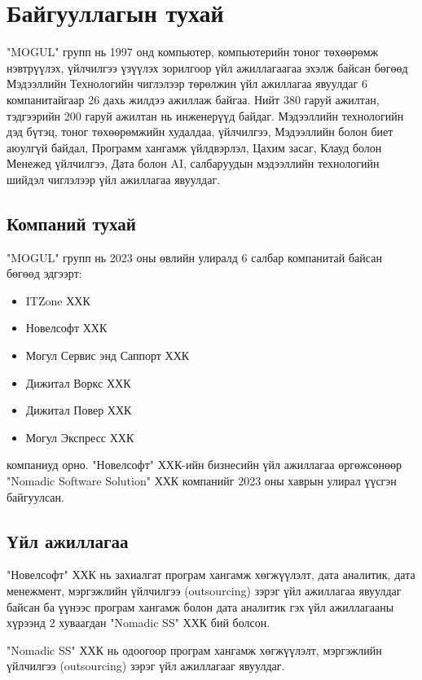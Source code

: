 \chapter{Байгууллагын тухай}

\hspace{0.5cm}
"MOGUL" групп нь 1997 онд компьютер, компьютерийн тоног төхөөрөмж нэвтрүүлэх, үйлчилгээ үзүүлэх зорилгоор үйл ажиллагаагаа эхэлж байсан бөгөөд Мэдээллийн Технологийн чиглэлээр төрөлжин үйл ажиллагаа явуулдаг 6 компанитайгаар 26 дахь жилдээ ажиллаж байгаа. Нийт 380 гаруй ажилтан, тэдгээрийн 200 гаруй ажилтан нь инженерүүд байдаг. Мэдээллийн технологийн дэд бүтэц, тоног төхөөрөмжийн худалдаа, үйлчилгээ, Мэдээллийн болон биет аюулгүй байдал, Программ хангамж үйлдвэрлэл, Цахим засаг, Клауд болон Менежед үйлчилгээ, Дата болон AI, салбаруудын мэдээллийн технологийн шийдэл чиглэлээр үйл ажиллагаа явуулдаг.

\section{Компаний тухай}
"MOGUL" групп нь 2023 оны өвлийн улиралд 6 салбар компанитай байсан бөгөөд эдгээрт: 
\begin{itemize}
	\item ITZone ХХК
	\item Новелсофт ХХК
	\item Могул Сервис энд Саппорт ХХК
	\item Дижитал Воркс ХХК
	\item Дижитал Повер ХХК
	\item Могул Экспресс ХХК
\end{itemize}
компаниуд орно. "Новелсофт" ХХК-ийн бизнесийн үйл ажиллагаа өргөжсөнөөр "Nomadic Software Solution" ХХК компанийг 2023 оны хаврын улирал үүсгэн байгуулсан. 

\section{Үйл ажиллагаа}
"Новелсофт" ХХК нь захиалгат програм хангамж хөгжүүлэлт, дата аналитик, дата менежмент, мэргэжлийн үйлчилгээ (outsourcing) зэрэг үйл ажиллагаа явуулдаг байсан ба үүнээс програм хангамж болон дата аналитик гэх үйл ажиллагааны хүрээнд 2 хуваагдан "Nomadic SS" ХХК бий болсон. 

"Nomadic SS" ХХК нь одоогоор програм хангамж хөгжүүлэлт, мэргэжлийн үйлчилгээ (outsourcing) зэрэг үйл ажиллагааг явуулдаг.

